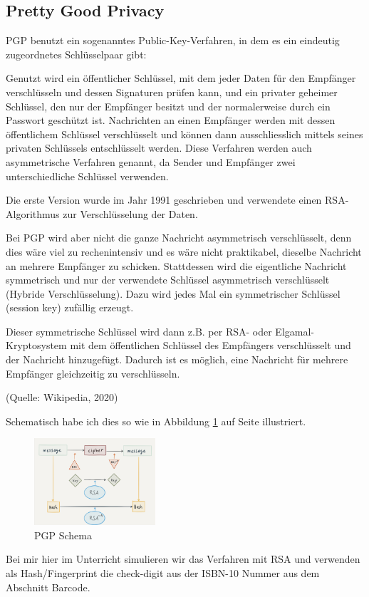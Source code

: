 \documentclass[%
<<<<<<< Updated upstream
11pt,%
twoside,%
titlepage,%
german,%
headsepline%
]{scrartcl}
\begin{document}
\begin{cdef}[Linksverschiebung]{}
\begin{cdef}{}
\clearpage

\section{Pretty Good Privacy}

PGP
benutzt ein sogenanntes Public-Key-Verfahren, in dem es ein eindeutig zugeordnetes Schlüsselpaar gibt:

Genutzt wird ein öffentlicher Schlüssel, mit dem jeder Daten für den Empfänger verschlüsseln und dessen Signaturen prüfen kann, und ein privater geheimer Schlüssel, den nur der Empfänger besitzt und der normalerweise durch ein Passwort geschützt ist. Nachrichten an einen Empfänger werden mit dessen öffentlichem Schlüssel verschlüsselt und können dann ausschliesslich mittels seines privaten Schlüssels entschlüsselt werden. Diese Verfahren werden auch asymmetrische Verfahren genannt, da Sender und Empfänger zwei unterschiedliche Schlüssel verwenden.

Die erste Version wurde im Jahr 1991 geschrieben und verwendete einen RSA-Al\-go\-rith\-mus zur Verschlüsselung der Daten.

Bei PGP wird aber nicht die ganze Nachricht asymmetrisch verschlüsselt, denn dies wäre viel zu rechenintensiv und es wäre nicht praktikabel, dieselbe Nachricht an mehrere Empfänger zu schicken. Stattdessen wird die eigentliche Nachricht symmetrisch und nur der verwendete Schlüssel asymmetrisch verschlüsselt (Hybride Verschlüsselung). Dazu wird jedes Mal ein symmetrischer Schlüssel (session key) zufällig erzeugt.

Dieser symmetrische Schlüssel wird dann z.B. per RSA- oder Elgamal-Kryptosystem mit dem öffentlichen Schlüssel des Empfängers verschlüsselt und der Nachricht hinzugefügt. Dadurch ist es möglich, eine Nachricht für mehrere Empfänger gleichzeitig zu verschlüsseln.

\hfill(Quelle: Wikipedia, 2020)

Schematisch
habe ich dies so wie in Abbildung \ref{fig:pgp} auf Seite \pageref{fig:pgp} illustriert.
\begin{figure}
    \centering
    \includegraphics[width=0.4\textwidth]{pictures/pgpscheme.jpeg}
    \caption{PGP Schema}
    \label{fig:pgp}
\end{figure}
Bei mir hier im Unterricht simulieren wir das Verfahren mit RSA und verwenden als Hash/Fingerprint die check-digit aus der ISBN-10 Nummer aus dem Abschnitt Barcode.


\end{cdef}
\end{cdef}
\end{document}
